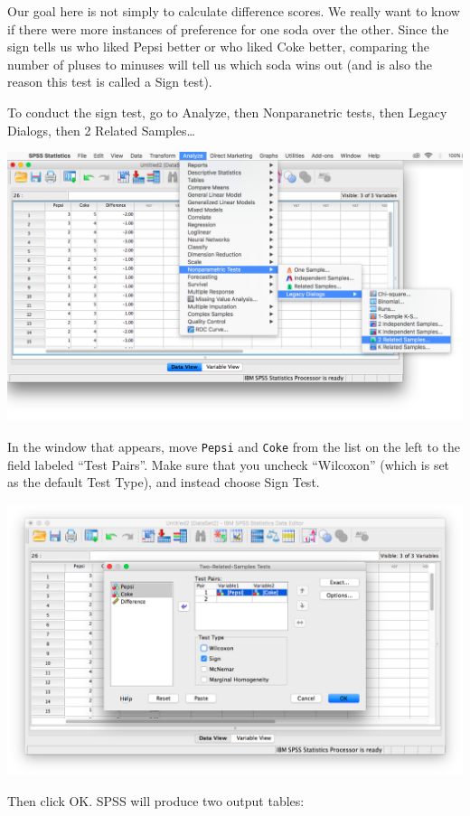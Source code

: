 \documentclass[
]{book}
\begin{document}
Our goal here is not simply to calculate difference scores. We really want to know if there were more instances of preference for one soda over the other. Since the sign tells us who liked Pepsi better or who liked Coke better, comparing the number of pluses to minuses will tell us which soda wins out (and is also the reason this test is called a Sign test).

To conduct the sign test, go to {Analyze}, then {Nonparanetric tests}, then {Legacy Dialogs}, then {2 Related Samples\ldots{}}

\includegraphics{img/5.4.15.png}

In the window that appears, move \texttt{Pepsi} and \texttt{Coke} from the list on the left to the field labeled ``Test Pairs''. Make sure that you uncheck ``Wilcoxon'' (which is set as the default Test Type), and instead choose {Sign Test}.

\includegraphics{img/5.4.16.png}

Then click {OK}. SPSS will produce two output tables:
\end{document}
